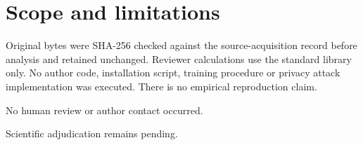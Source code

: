 \documentclass[10pt]{article}
\begin{document}
\section*{Scope and limitations}
Original bytes were SHA-256 checked against the source-acquisition record before analysis and retained unchanged. Reviewer calculations use the standard library only. No author code, installation script, training procedure or privacy attack implementation was executed. There is no empirical reproduction claim.\par
No human review or author contact occurred.\par
Scientific adjudication remains pending.\par
\end{document}
